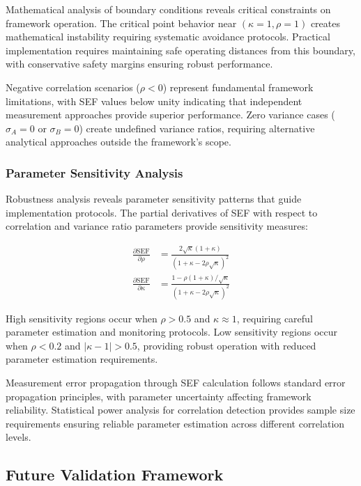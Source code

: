 Mathematical analysis of boundary conditions reveals critical constraints on framework operation. The critical point behavior near $(\kappa=1, \rho=1)$ creates mathematical instability requiring systematic avoidance protocols. Practical implementation requires maintaining safe operating distances from this boundary, with conservative safety margins ensuring robust performance.

Negative correlation scenarios ($\rho < 0$) represent fundamental framework limitations, with SEF values below unity indicating that independent measurement approaches provide superior performance. Zero variance cases ($\sigma_A = 0$ or $\sigma_B = 0$) create undefined variance ratios, requiring alternative analytical approaches outside the framework's scope.

\subsubsection{Parameter Sensitivity Analysis}

Robustness analysis reveals parameter sensitivity patterns that guide implementation protocols. The partial derivatives of SEF with respect to correlation and variance ratio parameters provide sensitivity measures:

\begin{align}
\frac{\partial \text{SEF}}{\partial \rho} &= \frac{2\sqrt{\kappa}(1+\kappa)}{(1+\kappa-2\rho\sqrt{\kappa})^2} \\
\frac{\partial \text{SEF}}{\partial \kappa} &= \frac{1-\rho(1+\kappa)/\sqrt{\kappa}}{(1+\kappa-2\rho\sqrt{\kappa})^2}
\end{align}

High sensitivity regions occur when $\rho > 0.5$ and $\kappa \approx 1$, requiring careful parameter estimation and monitoring protocols. Low sensitivity regions occur when $\rho < 0.2$ and $|\kappa-1| > 0.5$, providing robust operation with reduced parameter estimation requirements.

Measurement error propagation through SEF calculation follows standard error propagation principles, with parameter uncertainty affecting framework reliability. Statistical power analysis for correlation detection provides sample size requirements ensuring reliable parameter estimation across different correlation levels.

\subsection{Future Validation Framework}

